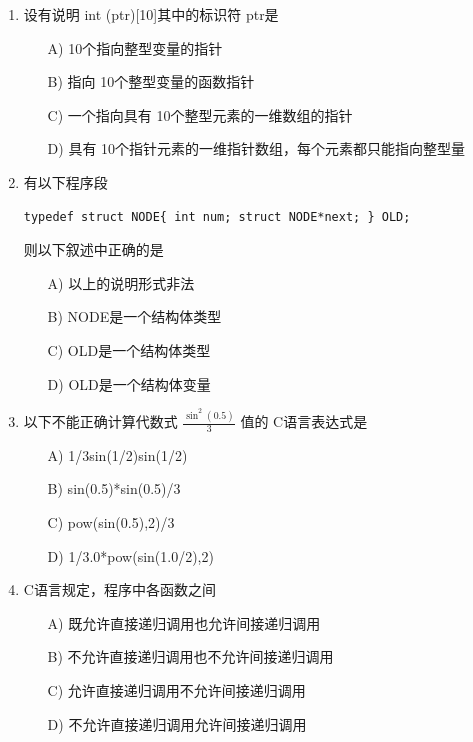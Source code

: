 \documentclass[12pt,a4paper]{article}
\begin{document}
\begin{enumerate}
    \item 设有说明 int (\*ptr)[10]其中的标识符 ptr是
    \begin{enumerate}
        \item[A)] 10个指向整型变量的指针
        \item[B)] 指向 10个整型变量的函数指针
        \item[C)] 一个指向具有 10个整型元素的一维数组的指针
        \item[D)] 具有 10个指针元素的一维指针数组，每个元素都只能指向整型量
    \end{enumerate}
    
    \item 有以下程序段
    \begin{verbatim}
typedef struct NODE{ int num; struct NODE*next; } OLD;
    \end{verbatim}
    则以下叙述中正确的是
    \begin{enumerate}
        \item[A)] 以上的说明形式非法
        \item[B)] NODE是一个结构体类型
        \item[C)] OLD是一个结构体类型
        \item[D)] OLD是一个结构体变量
    \end{enumerate}
    
    \item 以下不能正确计算代数式 $\frac{\sin^2(0.5)}{3}$ 值的 C语言表达式是
    \begin{enumerate}
        \item[A)] 1/3\*sin(1/2)\*sin(1/2)
        \item[B)] sin(0.5)*sin(0.5)/3
        \item[C)] pow(sin(0.5),2)/3
        \item[D)] 1/3.0*pow(sin(1.0/2),2)
    \end{enumerate}
    
    \item C语言规定，程序中各函数之间
    \begin{enumerate}
        \item[A)] 既允许直接递归调用也允许间接递归调用
        \item[B)] 不允许直接递归调用也不允许间接递归调用
        \item[C)] 允许直接递归调用不允许间接递归调用
        \item[D)] 不允许直接递归调用允许间接递归调用
    \end{enumerate}
    

\end{enumerate}
\end{document}
